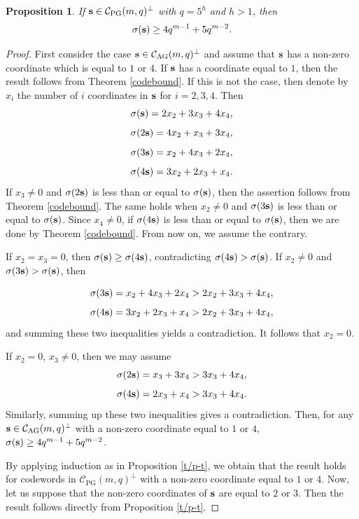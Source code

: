 \documentclass[12pt]{article}
\newcommand{\cC}{{\mathcal C}}
\newtheorem{proposition}[theorem]{Proposition}
\DeclareMathOperator{\PG}{{PG}}
\DeclareMathOperator{\AG}{{AG}}
\begin{document}
	\begin{proposition}
		\label{codebound3}
		If ${\bf s}\in \cC_{\PG}(m,q)^\perp$ with  $q=5^h$ and $h>1$, then 
		\[\sigma({\bf s}) \geq 4q^{m-1}+5q^{m-2}.\]
	\end{proposition}
	\begin{proof}
		
		First consider the case ${ \bf s } \in \cC_{\AG}(m,q)^\perp$ and assume that ${\bf s}$ has a non-zero coordinate which is equal to $1$ or $4$.  If  ${\bf s}$ has a coordinate equal to $1$, then the result follows from Theorem \ref{codebound}. If this is not the case, then denote by $x_i$ the number of $i$ coordinates in ${\bf s}$ for $i=2,3,4$. Then 
		\[\sigma({\bf s})=2x_2+3x_3+4x_4,\]
		\[\sigma(2{\bf s})=4x_2+x_3+3x_4,\]
		\[\sigma(3{\bf s})=x_2+4x_3+2x_4,\]
		\[\sigma(4{\bf s})=3x_2+2x_3+x_4.\] 
		If $x_3\neq 0$ and  $\sigma(2{\bf s})$ is less than or equal to $\sigma({\bf s})$, then the assertion follows from Theorem \ref{codebound}. 
		The same holds when $x_2\neq 0$ and $\sigma(3{\bf s})$ is less than or equal to $\sigma({\bf s})$. Since $x_4\neq 0$, if $\sigma(4{\bf s})$ is less than or equal to $\sigma({\bf s})$, then we are done by Theorem \ref{codebound}. From now on, we assume the contrary.
		
		If $x_2=x_3=0$, then  $\sigma( {\bf s}) \geq \sigma (4{\bf s})$, contradicting 
		$\sigma(4 {\bf s})>\sigma({\bf s})$. If $x_2\neq 0$ and $\sigma(3{\bf s}) > \sigma({\bf s})$, then
		
		\[\sigma(3{\bf s})=x_2+4x_3+2x_4 > 2x_2+3x_3+4x_4,\]
		\[\sigma(4{\bf s})=3x_2+2x_3+x_4 > 2x_2+3x_3+4x_4,\]
		and summing these two inequalities yields a contradiction. It follows that $x_2=0$.
		
		If $x_2=0$, $x_3\neq 0$, then we may assume 
		\[\sigma(2{\bf s})=x_3+3x_4 > 3x_3+4x_4,\]
		\[\sigma(4{\bf s})=2x_3+x_4 > 3x_3+4x_4.\]
		Similarly, summing up these two inequalities gives a contradiction. 
		Then, for any ${ \bf s } \in \cC_{\AG}(m,q)^\perp$ with a non-zero coordinate equal to $1$ or $4$, $\sigma({\bf s}) \geq 4 q^{m-1}+5q^{m-2}$. 
		
		By applying induction as in Proposition \ref{t/p-t}, we obtain that the result holds for  codewords in $\cC_{\PG}(m,q)^\perp$ with a non-zero coordinate equal to $1$ or $4$.
		Now, let us suppose that the non-zero coordinates of ${ \bf s}$ are equal to $2$ or $3$. Then the result follows directly from Proposition \ref{t/p-t}.
	\end{proof}
	
\end{document}
